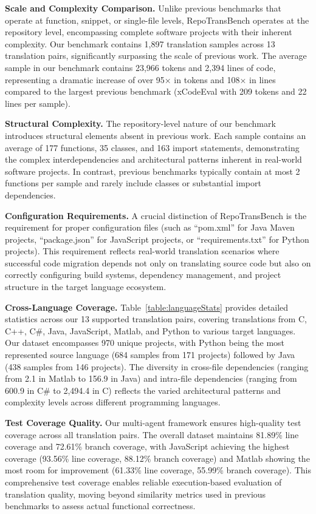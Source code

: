 \textbf{Scale and Complexity Comparison.} Unlike previous benchmarks that operate at function, snippet, or single-file levels, RepoTransBench operates at the repository level, encompassing complete software projects with their inherent complexity. Our benchmark contains 1,897 translation samples across 13 translation pairs, significantly surpassing the scale of previous work. The average sample in our benchmark contains 23,966 tokens and 2,394 lines of code, representing a dramatic increase of over 95× in tokens and 108× in lines compared to the largest previous benchmark (xCodeEval with 209 tokens and 22 lines per sample).

\textbf{Structural Complexity.} The repository-level nature of our benchmark introduces structural elements absent in previous work. Each sample contains an average of 177 functions, 35 classes, and 163 import statements, demonstrating the complex interdependencies and architectural patterns inherent in real-world software projects. In contrast, previous benchmarks typically contain at most 2 functions per sample and rarely include classes or substantial import dependencies.

\textbf{Configuration Requirements.} A crucial distinction of RepoTransBench is the requirement for proper configuration files (such as ``pom.xml'' for Java Maven projects, ``package.json'' for JavaScript projects, or ``requirements.txt'' for Python projects). This requirement reflects real-world translation scenarios where successful code migration depends not only on translating source code but also on correctly configuring build systems, dependency management, and project structure in the target language ecosystem.


\textbf{Cross-Language Coverage.} Table~\ref{table:languageStats} provides detailed statistics across our 13 supported translation pairs, covering translations from C, C++, C\#, Java, JavaScript, Matlab, and Python to various target languages. Our dataset encompasses 970 unique projects, with Python being the most represented source language (684 samples from 171 projects) followed by Java (438 samples from 146 projects). The diversity in cross-file dependencies (ranging from 2.1 in Matlab to 156.9 in Java) and intra-file dependencies (ranging from 600.9 in C\# to 2,494.4 in C) reflects the varied architectural patterns and complexity levels across different programming languages.

\textbf{Test Coverage Quality.} Our multi-agent framework ensures high-quality test coverage across all translation pairs. The overall dataset maintains 81.89\% line coverage and 72.61\% branch coverage, with JavaScript achieving the highest coverage (93.56\% line coverage, 88.12\% branch coverage) and Matlab showing the most room for improvement (61.33\% line coverage, 55.99\% branch coverage). This comprehensive test coverage enables reliable execution-based evaluation of translation quality, moving beyond similarity metrics used in previous benchmarks to assess actual functional correctness.



